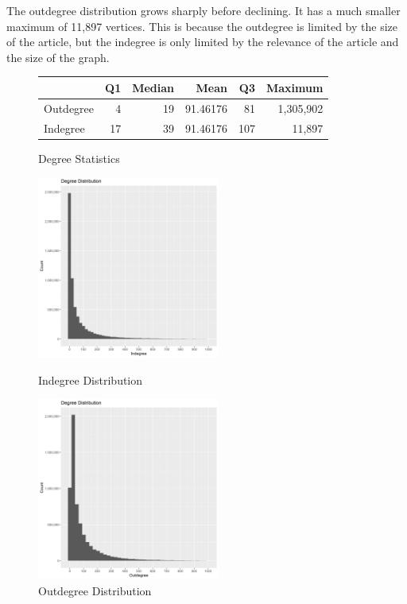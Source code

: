 \documentclass{article}
\begin{document}
The outdegree distribution grows sharply before declining. It has a much smaller maximum of 11,897 vertices. This is because the outdegree is limited by the size of the article, but the indegree is only limited by the relevance of the article and the size of the graph.


\begin{figure}[H]
    \centering
    \caption[]{Degree Statistics}
    \begin{tabular}{lrrrrr}
        \toprule
        & Q1 & Median & Mean & Q3 & Maximum\\
        \midrule
        Outdegree & 4 & 19 & 91.46176 & 81 & 1,305,902\\
        Indegree & 17 & 39 & 91.46176 & 107 & 11,897\\
        \bottomrule
    \end{tabular}
\end{figure}

\begin{figure}[H]
    \centering
    \parbox{6cm}{
    \includegraphics[width=6cm]{in_degree_dist}
    \caption{Indegree Distribution}
    \label{fig:2figsA}}
    \qquad
    \begin{minipage}{6cm}
    \includegraphics[width=6cm]{out_degree_dist}
    \caption{Outdegree Distribution}
    \label{fig:2figsB}
    \end{minipage}
\end{figure}
\end{document}
